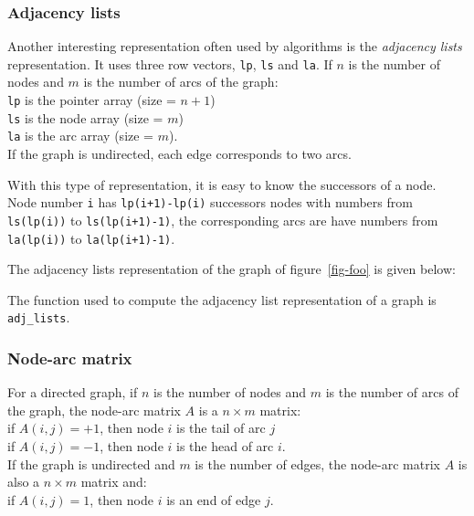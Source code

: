 \documentclass[11pt]{article}
\newcommand{\func}[1]{\texttt{#1}}
\begin{document}
\subsubsection{Adjacency lists}\label{adjacency}

Another interesting representation often used by algorithms is the
\emph{adjacency lists} representation. 
It uses three row vectors, \texttt{lp},
\texttt{ls} and \texttt{la}. If $n$ is the number of nodes and $m$ is the number
of arcs of the graph:\\
\texttt{lp} is the pointer  array  (size = $n+1$)\\
\texttt{ls} is the node array (size = $m$)\\
\texttt{la} is the arc array (size = $m$).\\
If the graph is undirected, each edge corresponds to two arcs.

With this type of representation, it is easy to know the successors of
a node. Node number \texttt{i} has \texttt{lp(i+1)-lp(i)} successors
nodes with numbers from
\texttt{ls(lp(i))} to \texttt{ls(lp(i+1)-1)},
the corresponding arcs are have numbers from 
\texttt{la(lp(i))} to \texttt{la(lp(i+1)-1)}.

The adjacency lists representation of the graph of figure~\ref{fig-foo}
is given below:

\begin{center}

\end{center}

The function used to compute the adjacency list
representation of a graph is \func{adj\_lists}.

\subsubsection{Node-arc matrix}

For a directed graph,
if $n$ is the number of nodes and $m$ is the number of arcs of the
graph, the node-arc matrix $A$ is a $n\times m$ 
matrix:\\
if $A(i,j)=+1$, then node $i$ is the tail of arc $j$\\
if $A(i,j)=-1$, then node $i$ is the head of arc $i$.\\
If the graph is undirected and $m$ is the number of edges, 
the node-arc matrix $A$ is also a $n\times m$ matrix and:\\
if $A(i,j)=1$, then node $i$ is an end of edge $j$.
\end{document}
